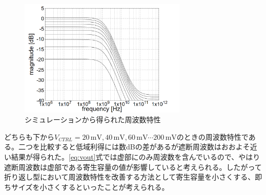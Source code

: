 \documentclass[twocolumn]{jsarticle}
\begin{document}
    \begin{figure}[H]
        \begin{center}
            \includegraphics*[width = 80mm]{figures/vout_ac_simulation_monochrome.PNG}
            \caption{シミュレーションから得られた周波数特性}
            \label{fig:vout_sim}
        \end{center}
    \end{figure}
    \clearpage
    どちらも下から$V_{CTRL}=20\,\mathrm{mV},40\,\mathrm{mV},60\,\mathrm{mV}\cdots200\,\mathrm{mV}$のときの周波数特性である。二つを比較すると低域利得には数dBの差があるが遮断周波数はおおよそ近い結果が得られた。\eqref{eq:vout}式では虚部にのみ周波数を含んでいるので、やはり遮断周波数は虚部である寄生容量の値が影響していると考えられる。したがって折り返し型において周波数特性を改善する方法として寄生容量を小さくする、即ちサイズを小さくするといったことが考えられる。
\end{document}

